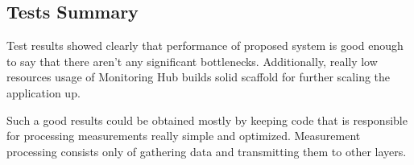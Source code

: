 \subsection{Tests Summary}

Test results showed clearly that performance of proposed system is good enough to say that there aren\rq{}t any significant bottlenecks. Additionally, really low resources usage of Monitoring Hub builds solid scaffold for further scaling the application up.

Such a good results could be obtained mostly by keeping code that is responsible for processing measurements really simple and optimized. Measurement processing consists only of gathering data and transmitting them to other layers.


